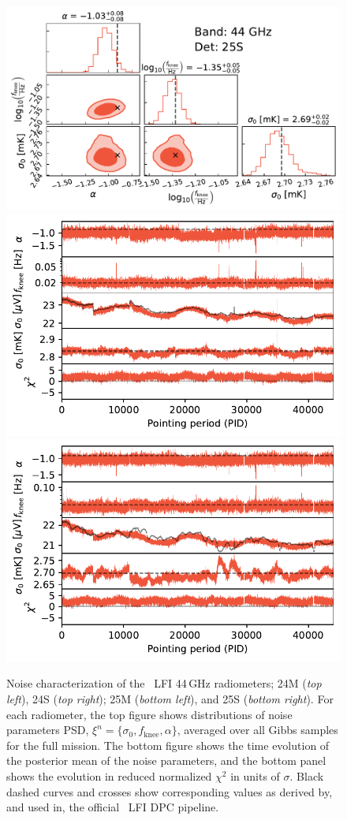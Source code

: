 \documentclass[twocolumn]{aa}
\begin{document}
\begin{figure}[p]
\begin{center}
		\includegraphics[width=0.495\linewidth]{figs/corner_band_044_det_4_mean.pdf}\\
		\includegraphics[width=0.495\linewidth]{figs/xi_vs_pid_band_044_det_3_mean.pdf}
		\includegraphics[width=0.495\linewidth]{figs/xi_vs_pid_band_044_det_4_mean.pdf}
		 \vspace*{-5.8mm}            
	\end{center}
	
	\caption{Noise characterization of the \Planck\ LFI 44\,GHz
		radiometers; 24M (\emph{top left}), 24S (\emph{top right}); 25M
		(\emph{bottom left}), and 25S (\emph{bottom right}). For each
		radiometer, the top figure shows distributions of noise parameters
		PSD, $\xi^n = \{\sigma_0, f_\mathrm{knee}, \alpha\}$, averaged
		over all Gibbs samples for the full mission. The bottom figure
		shows the time evolution of the posterior mean of the noise
		parameters, and the bottom panel shows the evolution in reduced
		normalized $\chi^2$ in units of $\sigma$. Black dashed curves and crosses show corresponding values as derived by, and used in, the
		official \Planck\ LFI DPC pipeline.
		\label{fig:xi_prop_44}}
\end{figure}
\end{document}
